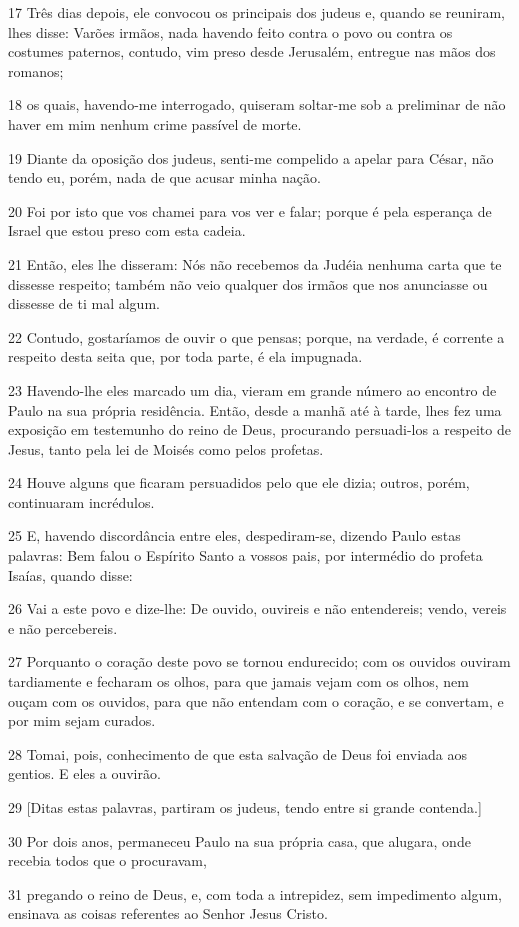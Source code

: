 \par 17 Três dias depois, ele convocou os principais dos judeus e, quando se reuniram, lhes disse: Varões irmãos, nada havendo feito contra o povo ou contra os costumes paternos, contudo, vim preso desde Jerusalém, entregue nas mãos dos romanos;
\par 18 os quais, havendo-me interrogado, quiseram soltar-me sob a preliminar de não haver em mim nenhum crime passível de morte.
\par 19 Diante da oposição dos judeus, senti-me compelido a apelar para César, não tendo eu, porém, nada de que acusar minha nação.
\par 20 Foi por isto que vos chamei para vos ver e falar; porque é pela esperança de Israel que estou preso com esta cadeia.
\par 21 Então, eles lhe disseram: Nós não recebemos da Judéia nenhuma carta que te dissesse respeito; também não veio qualquer dos irmãos que nos anunciasse ou dissesse de ti mal algum.
\par 22 Contudo, gostaríamos de ouvir o que pensas; porque, na verdade, é corrente a respeito desta seita que, por toda parte, é ela impugnada.
\par 23 Havendo-lhe eles marcado um dia, vieram em grande número ao encontro de Paulo na sua própria residência. Então, desde a manhã até à tarde, lhes fez uma exposição em testemunho do reino de Deus, procurando persuadi-los a respeito de Jesus, tanto pela lei de Moisés como pelos profetas.
\par 24 Houve alguns que ficaram persuadidos pelo que ele dizia; outros, porém, continuaram incrédulos.
\par 25 E, havendo discordância entre eles, despediram-se, dizendo Paulo estas palavras: Bem falou o Espírito Santo a vossos pais, por intermédio do profeta Isaías, quando disse:
\par 26 Vai a este povo e dize-lhe: De ouvido, ouvireis e não entendereis; vendo, vereis e não percebereis.
\par 27 Porquanto o coração deste povo se tornou endurecido; com os ouvidos ouviram tardiamente e fecharam os olhos, para que jamais vejam com os olhos, nem ouçam com os ouvidos, para que não entendam com o coração, e se convertam, e por mim sejam curados.
\par 28 Tomai, pois, conhecimento de que esta salvação de Deus foi enviada aos gentios. E eles a ouvirão.
\par 29 [Ditas estas palavras, partiram os judeus, tendo entre si grande contenda.]
\par 30 Por dois anos, permaneceu Paulo na sua própria casa, que alugara, onde recebia todos que o procuravam,
\par 31 pregando o reino de Deus, e, com toda a intrepidez, sem impedimento algum, ensinava as coisas referentes ao Senhor Jesus Cristo.


